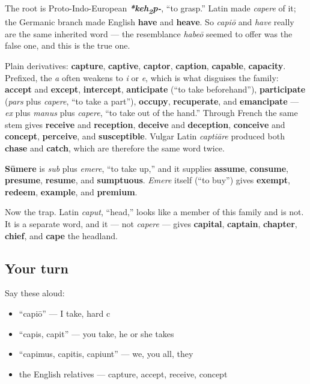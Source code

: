 \begin{cousinweb}
The root is Proto-Indo-European \emph{\textbf{*keh\textsubscript{2}p-}}, \textquotedblleft{}to grasp.\textquotedblright{} Latin made \emph{capere} of it; the Germanic branch made English \textbf{have} and \textbf{heave}. So \emph{capiō} and \emph{have} really are the same inherited word — the resemblance \emph{habeō} seemed to offer was the false one, and this is the true one.

Plain derivatives: \textbf{capture}, \textbf{captive}, \textbf{captor}, \textbf{caption}, \textbf{capable}, \textbf{capacity}. Prefixed, the \emph{a} often weakens to \emph{i} or \emph{e}, which is what disguises the family: \textbf{accept} and \textbf{except}, \textbf{intercept}, \textbf{anticipate} (\textquotedblleft{}to take beforehand\textquotedblright{}), \textbf{participate} (\emph{pars} plus \emph{capere}, \textquotedblleft{}to take a part\textquotedblright{}), \textbf{occupy}, \textbf{recuperate}, and \textbf{emancipate} — \emph{ex} plus \emph{manus} plus \emph{capere}, \textquotedblleft{}to take out of the hand.\textquotedblright{} Through French the same stem gives \textbf{receive} and \textbf{reception}, \textbf{deceive} and \textbf{deception}, \textbf{conceive} and \textbf{concept}, \textbf{perceive}, and \textbf{susceptible}. Vulgar Latin \emph{captiāre} produced both \textbf{chase} and \textbf{catch}, which are therefore the same word twice.

\textbf{Sūmere} is \emph{sub} plus \emph{emere}, \textquotedblleft{}to take up,\textquotedblright{} and it supplies \textbf{assume}, \textbf{consume}, \textbf{presume}, \textbf{resume}, and \textbf{sumptuous}. \emph{Emere} itself (\textquotedblleft{}to buy\textquotedblright{}) gives \textbf{exempt}, \textbf{redeem}, \textbf{example}, and \textbf{premium}.

Now the trap. Latin \emph{caput}, \textquotedblleft{}head,\textquotedblright{} looks like a member of this family and is not. It is a separate word, and it — not \emph{capere} — gives \textbf{capital}, \textbf{captain}, \textbf{chapter}, \textbf{chief}, and \textbf{cape} the headland.
\end{cousinweb}

\subsection*{Your turn}
Say these aloud:

\begin{itemize}
\raggedright
  \item \textquotedblleft{}capiō\textquotedblright{} — I take, hard c
  \item \textquotedblleft{}capis, capit\textquotedblright{} — you take, he or she takes
  \item \textquotedblleft{}capimus, capitis, capiunt\textquotedblright{} — we, you all, they
  \item the English relatives — capture, accept, receive, concept
\end{itemize}

